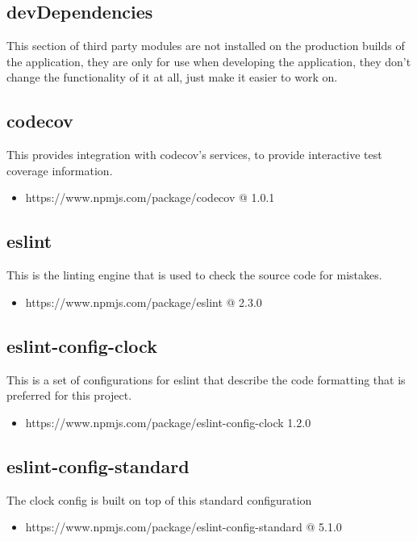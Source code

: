 \subsection{devDependencies}
  This section of third party modules are not installed on the production builds of the application, they are only for use when developing the application, they don't change the functionality of it at all, just make it easier to work on. 

  \subsection{codecov}
  This provides integration with codecov's services, to provide interactive test coverage information.
  \begin{itemize}
    \item https://www.npmjs.com/package/codecov @ 1.0.1
  \end{itemize}

  \subsection{eslint}
  This is the linting engine that is used to check the source code for mistakes.
  \begin{itemize}
    \item https://www.npmjs.com/package/eslint @ 2.3.0
  \end{itemize}

  \subsection{eslint-config-clock}
  This is a set of configurations for eslint that describe the code formatting that is preferred for this project.
  \begin{itemize}
    \item https://www.npmjs.com/package/eslint-config-clock 1.2.0
  \end{itemize}

  \subsection{eslint-config-standard}
  The clock config is built on top of this standard configuration
  \begin{itemize}
    \item https://www.npmjs.com/package/eslint-config-standard @ 5.1.0
  \end{itemize}

